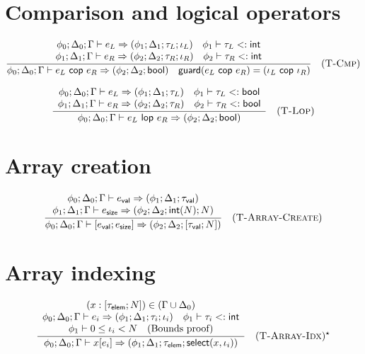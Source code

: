 \section*{Comparison and logical operators}

$$
  \frac{
    \begin{array}{c}
      \phi_0; \Delta_0; \Gamma \vdash e_L \Rightarrow (\phi_1; \Delta_1; \tau_L; \iota_L) \quad \phi_1 \vdash \tau_L <: \textsf{int} \\
      \phi_1; \Delta_1; \Gamma \vdash e_R \Rightarrow (\phi_2; \Delta_2; \tau_R; \iota_R) \quad \phi_2 \vdash \tau_R <: \textsf{int}
    \end{array}
  }{
    \phi_0; \Delta_0; \Gamma \vdash e_L \textsf{ cop } e_R \Rightarrow (\phi_2; \Delta_2; \textsf{bool}) \quad \mathsf{guard}(e_L \textsf{ cop } e_R) = (\iota_L \textsf{ cop } \iota_R)
  } \quad (\textsc{T-Cmp})
$$

$$
  \frac{
    \begin{array}{c}
      \phi_0; \Delta_0; \Gamma \vdash e_L \Rightarrow (\phi_1; \Delta_1; \tau_L) \quad \phi_1 \vdash \tau_L <: \textsf{bool} \\
      \phi_1; \Delta_1; \Gamma \vdash e_R \Rightarrow (\phi_2; \Delta_2; \tau_R) \quad \phi_2 \vdash \tau_R <: \textsf{bool}
    \end{array}
  }{
    \phi_0; \Delta_0; \Gamma \vdash e_L \textsf{ lop } e_R \Rightarrow (\phi_2; \Delta_2; \textsf{bool})
  } \quad (\textsc{T-Lop})
$$

\section*{Array creation}

$$
  \frac{
    \begin{array}{c}
      \phi_0; \Delta_0; \Gamma \vdash e_\textsf{val} \Rightarrow (\phi_1; \Delta_1; \tau_\textsf{val})   \\
      \phi_1; \Delta_1; \Gamma \vdash e_\textsf{size} \Rightarrow (\phi_2; \Delta_2; \textsf{int}(N); N)
    \end{array}
  }{
    \phi_0; \Delta_0; \Gamma \vdash [e_\textsf{val}; e_\textsf{size}] \Rightarrow (\phi_2; \Delta_2; [\tau_\textsf{val}; N])
  } \quad (\textsc{T-Array-Create})
$$

\section*{Array indexing}

$$
  \frac{
    \begin{array}{c}
      (x: [\tau_\textsf{elem}; N]) \in (\Gamma \cup \Delta_0)                                                               \\
      \phi_0; \Delta_0; \Gamma \vdash e_i \Rightarrow (\phi_1; \Delta_1; \tau_i; \iota_i) \quad \phi_1 \vdash \tau_i <: \textsf{int} \\
      \phi_1 \vdash 0 \le \iota_i < N \quad \text{(Bounds proof)}
    \end{array}
  }{
    \phi_0; \Delta_0; \Gamma \vdash x[e_i] \Rightarrow (\phi_1; \Delta_1; \tau_\textsf{elem}; \textsf{select}(x,\iota_i))
  } \quad (\textsc{T-Array-Idx})^\star
$$

